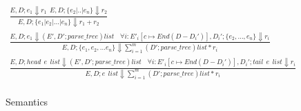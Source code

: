 \begin{figure*}[ht!]
\begin{gather*}
  \frac
  {E,D;e_1 \Downarrow r_1 ~~ E,D;\{e_2|..|e_n\} \Downarrow r_2}
  {E,D;\{e_1|e_2|...|e_n\} \Downarrow r_1+r_2}\\
  \tag{\sc E-Sturct}\label{rule:struct}
  \frac
  {E,D;e_1 \Downarrow (E',D';parse\_tree)list~~~~  \forall i:  E'_i[c \mapsto End(D-D_i')],D_i';\{e_2,...,e_n\} \Downarrow r_i}
  {E,D;\{e_1,e_2,...e_n\} \Downarrow \sum_{i=1}^{m} (D';parse\_tree)list*r_i}\\
  \tag{\sc E-List}\label{rule:list}
  \frac
  {E,D;head ~~e~~list \Downarrow (E',D';parse\_tree)list ~~~~ \forall i:  E'_i[c \mapsto End(D-D_i')],D_i';tail~~e~~list \Downarrow r_i}
  {E,D;e~~list \Downarrow \sum_{i=1}^{m} (D';parse\_tree)list*r_i}\\
\end{gather*}
\caption{Semantics}
\label{fig:semantics}
\end{figure*}
